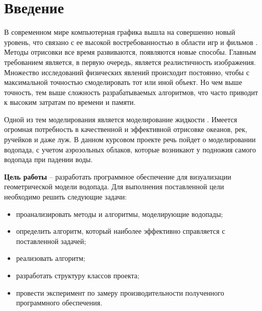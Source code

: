 \chapter*{Введение}


В современном мире компьютерная графика вышла на совершенно новый уровень, что связано с ее высокой востребованностью в области игр и фильмов \cite{realistic-water}. Методы отрисовки все время развиваются, появляются новые способы. Главным требованием является, в первую очередь, является реалистичность изображения. Множество исследований физических явлений происходит постоянно, чтобы с максимальной точностью смоделировать тот или иной объект. Но чем выше точность, тем выше сложность разрабатываемых алгоритмов, что часто приводит к высоким затратам по времени и памяти.

Одной из тем моделирования является моделирование жидкости \cite{water-matters}. Имеется огромная потребность в качественной и эффективной отрисовке океанов, рек, ручейков и даже луж. В данном курсовом проекте речь пойдет о моделировании водопада, с учетом аэрозольных облаков, которые возникают у подножия самого водопада при падении воды.

\textbf{Цель работы} -- разработать программное обеспечение для визуализации геометрической модели водопада. Для выполнения поставленной цели необходимо решить следующие задачи:

\begin{itemize}
	\item проанализировать методы и алгоритмы, моделирующие водопады; 
	\item определить алгоритм, который наиболее эффективно справляется с поставленной задачей;
	\item реализовать алгоритм;
	\item разработать структуру классов проекта;
	\item провести эксперимент по замеру производительности полученного программного обеспечения.
\end{itemize}
